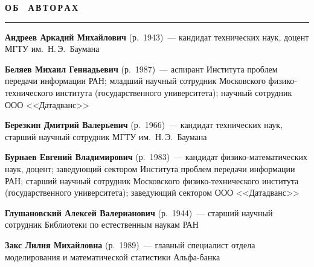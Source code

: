 \def\stat{authorsrus}
{%
\raggedleft\Large \bf%
О\,Б\ \ А\,В\,Т\,О\,Р\,А\,Х \vskip 17pt
    \hrule
    \par
{} }

\label{st\stat}


\def\rightkol{\ } %
\def\leftkol{ОБ АВТОРАХ} %


\vspace*{36pt}

\begin{multicols}{2}


\noindent 
\textbf{Андреев Аркадий Михайлович} (р.\ 1943)~--- кандидат 
технических наук, доцент МГТУ им.\ Н.\,Э.~Баумана 

\vspace*{4pt}

\noindent
\textbf{Беляев Михаил Геннадьевич} (р.\ 1987)~--- аспирант  Института проблем передачи 
информации РАН; младший научный сотрудник Московского фи\-зи\-ко-тех\-ни\-че\-ско\-го 
института (государственного университета); научный сотрудник ООО <<Датадванс>>


\vspace*{4pt}

\noindent 
\textbf{Березкин Дмитрий Валерьевич} (р.\ 1966)~--- кандидат 
технических наук, старший научный сотрудник МГТУ им.\ Н.\,Э.~Баумана 

\vspace*{4pt}

\noindent
\textbf{Бурнаев Евгений Владимирович} (р.\ 1983)~---  кандидат фи\-зи\-ко-ма\-те\-ма\-ти\-че\-ских наук, 
доцент; заведующий сектором  Института проблем передачи информации РАН; старший 
научный сотрудник Московского фи\-зи\-ко-тех\-ни\-че\-ско\-го института (государственного 
университета); заведующий сектором ООО <<Датадванс>>

\vspace*{4pt}

\noindent
\textbf{Глушановский Алексей  Валерианович} (р.\ 1944)~--- 
старший научный сотрудник Библиотеки по естественным  наукам РАН

\vspace*{4pt}

\noindent
\textbf{Закс Лилия Михайловна} (р.\ 1989)~--- главный специалист отдела 
моделирования и математической статистики Аль\-фа-банка



\end{multicols}
